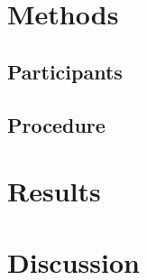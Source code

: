 \documentclass[twocolumn]{article}
\begin{document}
\section*{Methods}

\subsection*{Participants}
\lipsum[6]

\subsection*{Procedure}
\lipsum[7-8]


\section*{Results}
\lipsum[9-11]


\section*{Discussion}
\lipsum[12-14]




\end{document}
